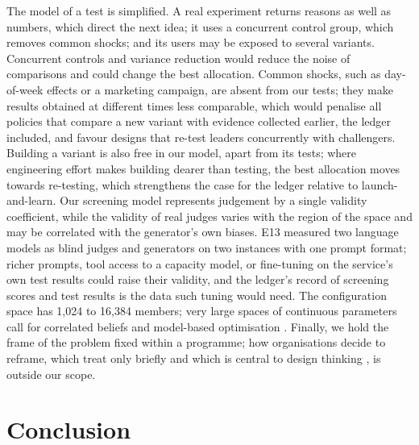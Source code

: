 \documentclass[preprint,12pt,authoryear]{elsarticle}
\theoremstyle{definition}
\begin{document}
The model of a test is simplified. A real experiment returns reasons as well as numbers, which direct the next idea; it uses a concurrent control group, which removes common shocks; and its users may be exposed to several variants. Concurrent controls and variance reduction \citep{deng2013} would reduce the noise of comparisons and could change the best allocation. Common shocks, such as day-of-week effects or a marketing campaign, are absent from our tests; they make results obtained at different times less comparable, which would penalise all policies that compare a new variant with evidence collected earlier, the ledger included, and favour designs that re-test leaders concurrently with challengers. Building a variant is also free in our model, apart from its tests; where engineering effort makes building dearer than testing, the best allocation moves towards re-testing, which strengthens the case for the ledger relative to launch-and-learn. Our screening model represents judgement by a single validity coefficient, while the validity of real judges varies with the region of the space and may be correlated with the generator's own biases. E13 measured two language models as blind judges and generators on two instances with one prompt format; richer prompts, tool access to a capacity model, or fine-tuning on the service's own test results could raise their validity, and the ledger's record of screening scores and test results is the data such tuning would need. The configuration space has 1,024 to 16,384 members; very large spaces of continuous parameters call for correlated beliefs and model-based optimisation \citep{frazier2008}. Finally, we hold the frame of the problem fixed within a programme; how organisations decide to reframe, which \citet{kuras2026} treat only briefly and which is central to design thinking \citep{dorst2011}, is outside our scope.

\section{Conclusion}
\label{sec:conclusion}
\end{document}

